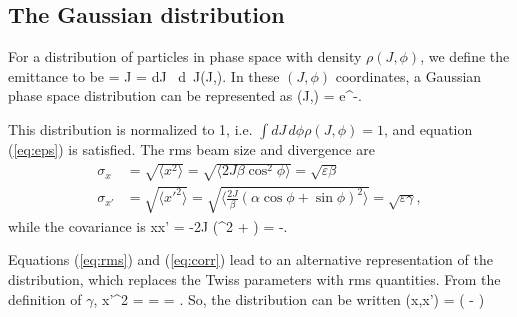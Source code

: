 \subsection{The Gaussian distribution}
For a distribution of particles in phase space with density $\rho(J,\phi)$, we define the emittance to be
\Begineq
	\varepsilon = \langle J \rangle = \int dJ \, d\phi \, J\rho(J,\phi).
	\label{eq:eps}
\Endeq
In these $(J,\phi)$ coordinates, a Gaussian phase space distribution can be represented as
\Begineq
	\rho(J,\phi) =  e^{-}.
	\label{eq:rho}
\Endeq

This distribution is normalized to 1, i.e. $\int dJ \, d\phi \rho(J,\phi) = 1$, and equation (\ref{eq:eps}) is satisfied.  The rms beam size and divergence are
\begin{align}
	\sigma_x & = \sqrt{\langle x^2 \rangle} = \sqrt{\langle 2J\beta \cos^2 \phi \rangle} = \sqrt{\varepsilon\beta}  \\
	\sigma_{x'} & = \sqrt{\langle x'^2 \rangle} = \sqrt{\biggl\langle \frac{2J}{\beta} (\alpha \cos\phi + \sin\phi)^2 \biggr\rangle} = \sqrt{\varepsilon\gamma},
	\label{eq:rms}
\end{align}
while the covariance is
\Begineq
	\langle xx' \rangle = \langle -2J (\alpha \cos^2 \phi + \sin\phi \cos\phi) \rangle = -\varepsilon\alpha.
	\label{eq:corr}
\Endeq

Equations (\ref{eq:rms}) and (\ref{eq:corr}) lead to an alternative representation of the distribution, which replaces the Twiss parameters with rms quantities.
From the definition of $\gamma$, 
\Begineq
	\langle x'^2 \rangle = \varepsilon{} =  \quad \Rightarrow \quad \varepsilon = .
\Endeq
So, the distribution can be written
\Begineq
	\rho(x,x') =  \exp \left( - \right)
\Endeq

